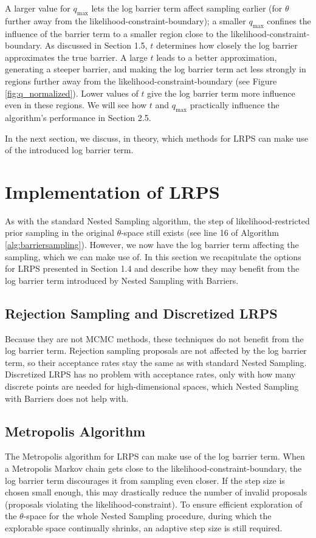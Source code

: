 \documentclass[12pt, a4paper]{report}
\begin{document}
A larger value for $q_{\textrm{max}}$ lets the log barrier term affect sampling earlier (for $\theta$ further away from the likelihood-constraint-boundary); a smaller $q_{\textrm{max}}$ confines the influence of the barrier term to a smaller region close to the likelihood-constraint-boundary.
As discussed in Section 1.5, $t$ determines how closely the log barrier approximates the true barrier.
A large $t$ leads to a better approximation, generating a steeper barrier, and making the log barrier term act less strongly in regions further away from the likelihood-constraint-boundary (see Figure \ref{fig:q_normalized}).
Lower values of $t$ give the log barrier term more influence even in these regions.
We will see how $t$ and $q_{\textrm{max}}$ practically influence the algorithm's performance in Section 2.5.

In the next section, we discuss, in theory, which methods for LRPS can make use of the introduced log barrier term.

\section{Implementation of LRPS}
As with the standard Nested Sampling algorithm, the step of likelihood-restricted prior sampling in the original $\theta$-space still exists (see line 16 of Algorithm \ref{alg:barriersampling}).
However, we now have the log barrier term affecting the sampling, which we can make use of.
In this section we recapitulate the options for LRPS presented in Section 1.4 and describe how they may benefit from the log barrier term introduced by Nested Sampling with Barriers.

\subsection{Rejection Sampling and Discretized LRPS}
Because they are not MCMC methods, these techniques do not benefit from the log barrier term.
Rejection sampling proposals are not affected by the log barrier term, so their acceptance rates stay the same as with standard Nested Sampling.
Discretized LRPS has no problem with acceptance rates, only with how many discrete points are needed for high-dimensional spaces, which Nested Sampling with Barriers does not help with.

\subsection{Metropolis Algorithm}
The Metropolis algorithm for LRPS can make use of the log barrier term.
When a Metropolis Markov chain gets close to the likelihood-constraint-boundary, the log barrier term discourages it from sampling even closer.
If the step size is chosen small enough, this may drastically reduce the number of invalid proposals (proposals violating the likelihood-constraint).
To ensure efficient exploration of the $\theta$-space for the whole Nested Sampling procedure, during which the explorable space continually shrinks, an adaptive step size is still required.
\end{document}
